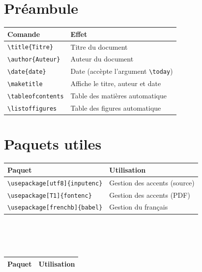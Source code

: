 \documentclass{article}
\begin{document}
\begin{multicols}{2}
\section*{Préambule}
\begin{tabular}{|l|l|}
	\arrayrulecolor{LightGray}
	\rowcolor{LightGray} Comande & Effet\\\hline
	\verb!\title{Titre}! & Titre du document \\\hline
	\verb!\author{Auteur}! & Auteur du document \\\hline
	\verb!\date{date}! & Date (accèpte l'argument \verb!\today!)\\\hline
	\verb!\maketitle! & Affiche le titre, auteur et date\\\hline
	\verb!\tableofcontents! & Table des matières automatique\\\hline
	\verb!\listoffigures! & Table des figures automatique\\\hline
\end{tabular}


\section*{Paquets utiles}
\begin{tabular}{|l|l|}
	\arrayrulecolor{LightGray}\hline
	\rowcolor{LightGray} Paquet & Utilisation\\\hline
	\verb!\usepackage[utf8]{inputenc}! & Gestion des accents (source)\\\hline
	\verb!\usepackage[T1]{fontenc}! & Gestion des accents (PDF)\\\hline
	\verb!\usepackage[frenchb]{babel}! & Gestion du français\\\hline
\end{tabular}
\ \\\ \\\ \\
\begin{tabular}{|l|l|}
	\arrayrulecolor{LightGray}\hline
	\rowcolor{LightGray} Paquet & Utilisation\\\hline


\end{tabular}
\end{multicols}
\end{document}
